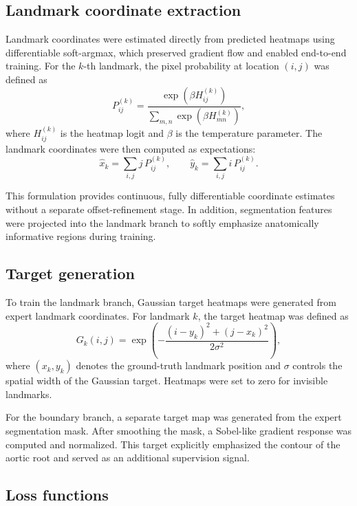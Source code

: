 \documentclass[preprint,12pt,authoryear]{elsarticle}
\begin{document}
\subsection{Landmark coordinate extraction}

Landmark coordinates were estimated directly from predicted heatmaps using differentiable soft-argmax, which preserved gradient flow and enabled end-to-end training. For the $k$-th landmark, the pixel probability at location $(i,j)$ was defined as
\begin{equation}
P_{ij}^{(k)}=
\frac{\exp\left(\beta H_{ij}^{(k)}\right)}
{\sum\limits_{m,n}\exp\left(\beta H_{mn}^{(k)}\right)},
\end{equation}
where $H_{ij}^{(k)}$ is the heatmap logit and $\beta$ is the temperature parameter. The landmark coordinates were then computed as expectations:
\begin{equation}
\hat{x}_k=\sum\limits_{i,j} j\,P_{ij}^{(k)}, \qquad
\hat{y}_k=\sum\limits_{i,j} i\,P_{ij}^{(k)}.
\end{equation}

This formulation provides continuous, fully differentiable coordinate estimates without a separate offset-refinement stage. In addition, segmentation features were projected into the landmark branch to softly emphasize anatomically informative regions during training.

\subsection{Target generation}

To train the landmark branch, Gaussian target heatmaps were generated from expert landmark coordinates. For landmark $k$, the target heatmap was defined as
\begin{equation}
G_k(i,j)=
\exp\left(
-\frac{(i-y_k)^2+(j-x_k)^2}{2\sigma^2}
\right),
\end{equation}
where $(x_k,y_k)$ denotes the ground-truth landmark position and $\sigma$ controls the spatial width of the Gaussian target. Heatmaps were set to zero for invisible landmarks.

For the boundary branch, a separate target map was generated from the expert segmentation mask. After smoothing the mask, a Sobel-like gradient response was computed and normalized. This target explicitly emphasized the contour of the aortic root and served as an additional supervision signal.

\subsection{Loss functions}
\end{document}
